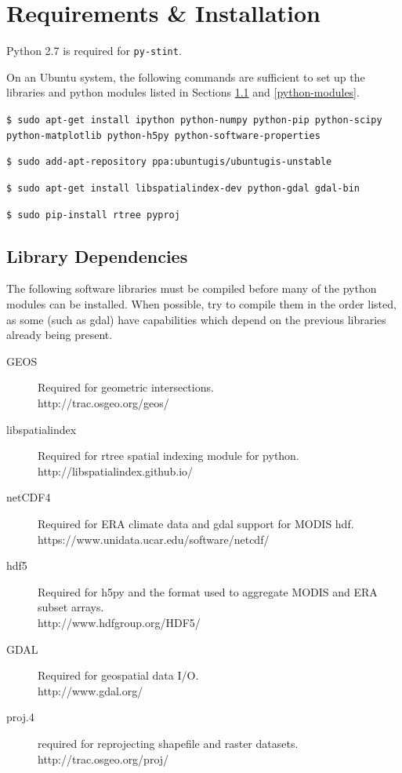 \documentclass[twoside,a4paper]{refart}
\begin{document}
\section{Requirements \& Installation}
\label{setup}

Python 2.7 is required for \texttt{py-stint}.

On an Ubuntu system, the following commands are sufficient to set up the libraries and python modules listed in Sections \ref{libraries} and \ref{python-modules}.

\texttt{\$ sudo apt-get install ipython python-numpy python-pip python-scipy python-matplotlib python-h5py python-software-properties}

\texttt{\$ sudo add-apt-repository ppa:ubuntugis/ubuntugis-unstable}

\texttt{\$ sudo apt-get install libspatialindex-dev python-gdal gdal-bin}

\texttt{\$ sudo pip-install rtree pyproj}


\subsection{Library Dependencies}\label{libraries}
The following software libraries must be compiled before many 
of the python modules can be installed.  
When possible, try to compile them in the order listed, as some 
(such as gdal) have capabilities which depend on the previous 
libraries already being present.
\begin{description}

\item[GEOS]
        Required for geometric intersections.\\
        http://trac.osgeo.org/geos/

\item[libspatialindex]
        Required for rtree spatial indexing module for python.\\
        http://libspatialindex.github.io/

\item[netCDF4]
        Required for ERA climate data and gdal support for MODIS hdf.\\
        https://www.unidata.ucar.edu/software/netcdf/
        
\item[hdf5]
       Required for h5py and the format used 
       to aggregate MODIS and ERA subset arrays.\\
       http://www.hdfgroup.org/HDF5/
       
\item[GDAL]
        Required for geospatial data I/O.\\
        http://www.gdal.org/

\item[proj.4]
       required for reprojecting shapefile and raster datasets.\\
       http://trac.osgeo.org/proj/

\end{description}
\end{document}
